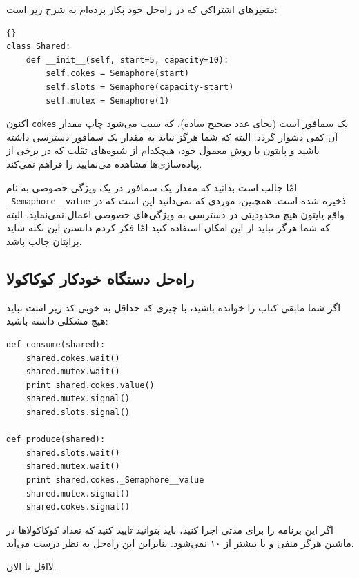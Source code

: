 \documentclass{book}
\newcommand{\clearemptydoublepage}{}%
\begin{document}
    متغیرهای اشتراکی که در راه‌حل خود بکار برده‌ام به شرح زیر است:

\begin{latin}
\begin{lstlisting}[title={}]{}
class Shared:
    def __init__(self, start=5, capacity=10):
        self.cokes = Semaphore(start)
        self.slots = Semaphore(capacity-start)
        self.mutex = Semaphore(1)
\end{lstlisting}
\end{latin}

    اکنون {\tt cokes} یک سمافور است (بجای عدد صحیح ساده)، که سبب می‌شود چاپ مقدار آن کمی دشوار گردد. 
    البته که  شما هرگز نباید به مقدار یک سمافور دسترسی داشته باشید و پایتون با روش معمول خود، هیچکدام از شیوه‌های تقلب که در برخی از پیاده‌سازی‌ها  
    مشاهده می‌نمایید را  فراهم نمی‌کند. 

    امّا جالب است بدانید که مقدار یک سمافور در یک ویژگی خصوصی به نام {\tt \_Semaphore\_\_value} ذخیره شده است. 
    همچنین، موردی که نمی‌دانید این است که در واقع پایتون هیچ محدودیتی در دسترسی به ویژگی‌های خصوصی اعمال نمی‌نماید. 
    البته که شما هرگز نباید از این امکان استفاده کنید امّا فکر کردم دانستن این نکته شاید برایتان جالب باشد. 


\clearemptydoublepage
\subsection {راه‌حل دستگاه خودکار کوکاکولا}

    اگر شما مابقی کتاب را خوانده باشید، با چیزی که حداقل به خوبی کد زیر است نباید هیچ مشکلی داشته باشید:

\begin{latin}
\begin{lstlisting}
def consume(shared):
    shared.cokes.wait()
    shared.mutex.wait()
    print shared.cokes.value()
    shared.mutex.signal()
    shared.slots.signal()

def produce(shared):
    shared.slots.wait()
    shared.mutex.wait()
    print shared.cokes._Semaphore__value
    shared.mutex.signal()
    shared.cokes.signal()
\end{lstlisting}
\end{latin}

    اگر این برنامه را برای مدتی اجرا کنید، باید بتوانید تایید کنید که تعداد کوکاکولاها در ماشین هرگز منفی و یا بیشتر از ۱۰ نمی‌شود. 
    بنابراین این راه‌حل به نظر درست می‌آید. 

    لااقل تا الان. 
\end{document}
